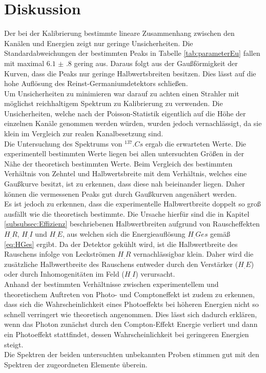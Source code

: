 
\section{Diskussion}
\label{sec:Diskussion}

Der bei der Kalibrierung bestimmte lineare Zusammenhang zwischen den Kanälen und Energien zeigt nur geringe Unsicherheiten. Die Standardabweichungen der bestimmten Peaks in Tabelle \ref{tab:parameterEu} fallen mit maximal $\num{6.1(8)}$ gering aus. Daraus folgt aus der Gaußförmigkeit der Kurven, dass die Peaks nur geringe Halbwertsbreiten besitzen. Dies lässt auf die hohe Auflösung des Reinst-Germaniumdetektors schließen.\\
Um Unsicherheiten zu minimieren war darauf zu achten einen Strahler mit möglichst reichhaltigem Spektrum zu Kalibrierung zu verwenden. Die Unsicherheiten, welche nach der Poisson-Statistik eigentlich auf die Höhe der einzelnen Kanäle genommen werden würden, wurden jedoch vernachlässigt, da sie klein im Vergleich zur realen Kanalbesetzung sind.\\
Die Untersuchung des Spektrums von $^{137}.{Cs}$ ergab die erwarteten Werte.
Die experimentell bestimmten Werte liegen bei allen untersuchten Größen in der Nähe der theoretisch bestimmten Werte.
Beim Vergleich des bestimmten Verhältnis von Zehntel und Halbwertsbreite mit dem Verhältnis, welches eine Gaußkurve besitzt, ist zu erkennen, dass diese nah beieinander liegen. Daher können die vermessenen Peaks gut durch Gaußkurven angenähert werden.\\
Es ist jedoch zu erkennen, dass die experimentelle Halbwertbreite doppelt so groß ausfällt wie die theoretisch bestimmte. Die Ursache hierfür sind die in Kapitel \ref{subsubsec:Effizienz} beschriebenen Halbwertbreiten aufgrund von Rauscheffekten $H_.R$, $H_.I$ und $H_.E$, aus welchen sich die Energieauflösung $H_.{Ges}$ gemäß \eqref{eq:HGes} ergibt. Da der Detektor gekühlt wird, ist die Halbwertbreite des Rauschens infolge von Leckströmen $H_.R$ vernachlässigbar klein. Daher wird die zusätzliche Halbwertbreite des Rauschens entweder durch den Verstärker ($H_.E$) oder durch Inhomogenitäten im Feld ($H_.I$) verursacht.\\
Anhand der bestimmten Verhältnisse zwischen experimentellem und theoretischem Auftreten von Photo- und Comptoneffekt ist zudem zu erkennen, dass sich die Wahrscheinlichkeit eines Photoeffekts bei höheren Energien nicht so schnell verringert wie theoretisch angenommen.
Dies lässt sich dadurch erklären, wenn das Photon zunächst durch den Compton-Effekt Energie verliert und dann ein Photoeffekt stattfindet, dessen Wahrscheinlichkeit bei geringeren Energien steigt.\\
Die Spektren der beiden untersuchten unbekannten Proben stimmen gut mit den Spektren der zugeordneten Elemente überein.